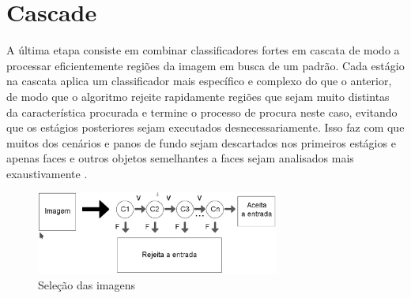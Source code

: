 \section{Cascade}\label{sec:cascade}

A última etapa consiste em combinar classificadores fortes em cascata de modo a
processar eficientemente regiões da imagem em busca de um padrão. Cada estágio na cascata aplica um classificador mais específico e complexo do que o anterior, de modo que o algoritmo rejeite rapidamente regiões que sejam muito distintas da característica procurada e termine o processo de procura neste caso, evitando que os estágios posteriores sejam executados desnecessariamente. Isso faz com que muitos dos cenários e panos de fundo sejam descartados nos primeiros estágios e apenas faces e outros objetos semelhantes a faces sejam analisados mais exaustivamente \cite{refer4}. 

\begin{figure}[ht]
\centering
\includegraphics[width=8cm]{images/haar-cascade.png}
\caption{Seleção das imagens}
\label{fig:haar cascade}
\end{figure}

